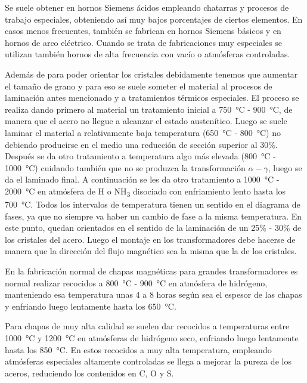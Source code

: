 \documentclass[12pt,a4paper]{article}
\begin{document}
Se suele obtener en hornos Siemens ácidos empleando chatarras y procesos de trabajo especiales, obteniendo así muy bajos porcentajes de ciertos elementos. En casos menos frecuentes, también se fabrican en hornos Siemens básicos y en hornos de arco eléctrico. Cuando se trata de fabricaciones muy especiales se utilizan también hornos de alta frecuencia con vacío o atmósferas controladas.

Además de para poder orientar los cristales debidamente tenemos que aumentar el tamaño de grano y para eso se suele someter el material al procesos de laminación antes mencionado y a tratamientos térmicos especiales. El proceso se realiza dando primero al material un tratamiento inicial a \SI{750}{\celsius} - \SI{900}{\celsius}, de manera que el acero no llegue a alcanzar el estado austenítico. Luego se suele laminar el material a relativamente baja temperatura (\SI{650}{\celsius} - \SI{800}{\celsius}) no debiendo producirse en el medio una reducción de sección superior al 30\%. Después se da otro tratamiento a temperatura algo más elevada (\SI{800}{\celsius} - \SI{1000}{\celsius}) cuidando también que no se produzca la transformación $\alpha-\gamma$, luego se da el laminado final. A continuación se les da otro tratamiento a \SI{1 000}{\celsius} - \SI{2 000}{\celsius} en atmósfera de H o NH\textsubscript{3} disociado con enfriamiento lento hasta los \SI{700}{\celsius}. Todos los intervalos de temperatura tienen un sentido en el diagrama de fases, ya que no siempre va haber un cambio de fase a la misma temperatura. En este punto, quedan orientados en el sentido de la laminación de un 25\% - 30\% de los cristales del acero. Luego el montaje en los transformadores debe hacerse de manera que la dirección del flujo magnético sea la misma que la de los cristales.

En la fabricación normal de chapas magnéticas para grandes transformadores es normal realizar recocidos a \SI{800}{\celsius} - \SI{900}{\celsius} en atmósfera de hidrógeno, manteniendo esa temperatura unas 4 a 8 horas según sea el espesor de las chapas y enfriando luego lentamente hasta los \SI{650}{\celsius}.

Para chapas de muy alta calidad se suelen dar recocidos a temperaturas entre \SI{1 000}{\celsius} y \SI{1 200}{\celsius} en atmósferas de hidrógeno seco, enfriando luego lentamente hasta los \SI{850}{\celsius}. En estos recocidos a muy alta temperatura, empleando atmósferas especiales altamente controladas se llega a mejorar la pureza de los aceros, reduciendo los contenidos en C, O y S.
\end{document}
